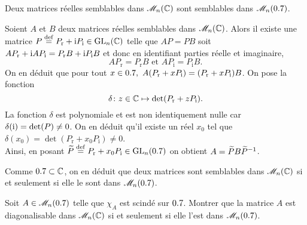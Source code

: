 \begin{prop}{}
    Deux matrices réelles semblables dans $\M_n(\C)$ sont semblables dans $\M_n(\R)$.
\end{prop}

\begin{preuve}
    Soient $A$ et $B$ deux matrices réelles semblables dans $\M_n(\C)$. Alors il existe une matrice $P \defeq P_{\mathrm{r}} + \i P_{\mathrm{i}} \in \Gl_n(\C)$ telle que $AP = PB$ soit $A P_{\mathrm{r}} + \i A P_{\mathrm{i}} = P_{\mathrm{r}} B + \i P_{\mathrm{i}} B$ et donc en identifiant parties réelle et imaginaire, $$A P_{\mathrm{r}} = P_{\mathrm{r}} B \text{ et } A P_{\mathrm{i}} = P_{\mathrm{i}} B.$$
    On en déduit que pour tout $x \in \R,\ A(P_{\mathrm{r}} + x P_{\mathrm{i}}) = (P_{\mathrm{r}} + x P_{\mathrm{i}})B$. On pose la fonction 
    $$\fonctionligne[\delta]{z \in \C}{\det(P_{\mathrm{r}} + z P_{\mathrm{i}})}.$$ 
    La fonction $\delta$ est polynomiale et est non identiquement nulle car $\delta(\i) = \det(P) \not=0$. On en déduit qu'il existe un réel $x_0$ tel que $\delta(x_0) = \det(P_{\mathrm{r}} + x_0 P_{\mathrm{i}}) \not=0$. \\
    Ainsi, en posant $\widetilde{P} \defeq P_{\mathrm{r}} + x_0 P_{\mathrm{i}} \in \Gl_n(\R)$ on obtient $A = \widetilde{P}B\Inv{\widetilde{P}}$.
\end{preuve}

\begin{remarque}
    Comme $\R \subset \C$, on en déduit que deux matrices sont semblables dans $\M_n(\C)$ si et seulement si elle le sont dans $\M_n(\R)$.
\end{remarque}

\begin{exercice}
    Soit $A \in \M_n(\R)$ telle que $\chi_A$ est scindé sur $\R$. Montrer que la matrice $A$ est diagonalisable dans $\M_n(\C)$ si et seulement si elle l'est dans $\M_n(\R)$.
\end{exercice}